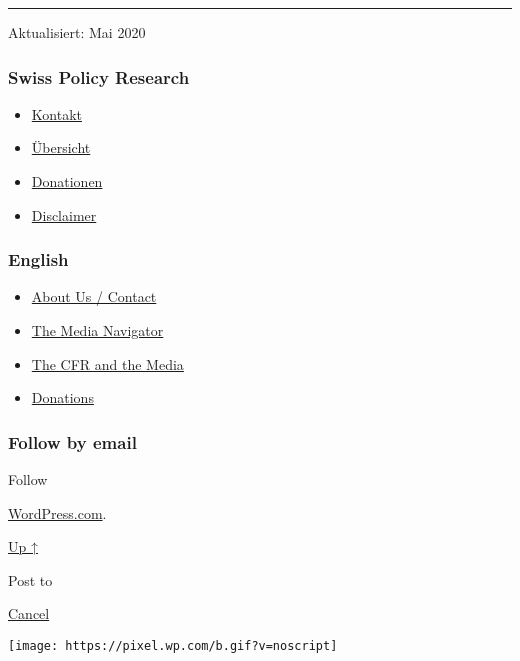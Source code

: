 \begin{center}\rule{0.5\linewidth}{\linethickness}\end{center}

Aktualisiert: Mai 2020

\hypertarget{swiss-policy-research}{%
\subsubsection{Swiss Policy Research}\label{swiss-policy-research}}

\begin{itemize}
\tightlist
\item
  \href{https://swprs.org/kontakt/}{Kontakt}
\item
  \href{https://swprs.org/uebersicht/}{Übersicht}
\item
  \href{https://swprs.org/donationen/}{Donationen}
\item
  \href{https://swprs.org/disclaimer/}{Disclaimer}
\end{itemize}

\hypertarget{english}{%
\subsubsection{English}\label{english}}

\begin{itemize}
\tightlist
\item
  \href{https://swprs.org/contact/}{About Us / Contact}
\item
  \href{https://swprs.org/media-navigator/}{The Media Navigator}
\item
  \href{https://swprs.org/the-american-empire-and-its-media/}{The CFR
  and the Media}
\item
  \href{https://swprs.org/donations/}{Donations}
\end{itemize}

\hypertarget{follow-by-email}{%
\subsubsection{Follow by email}\label{follow-by-email}}

Follow

\href{https://wordpress.com/?ref=footer_custom_com}{WordPress.com}.

\protect\hyperlink{}{Up ↑}

Post to

\protect\hyperlink{}{Cancel}

\texttt{[image: https://pixel.wp.com/b.gif?v=noscript]}
